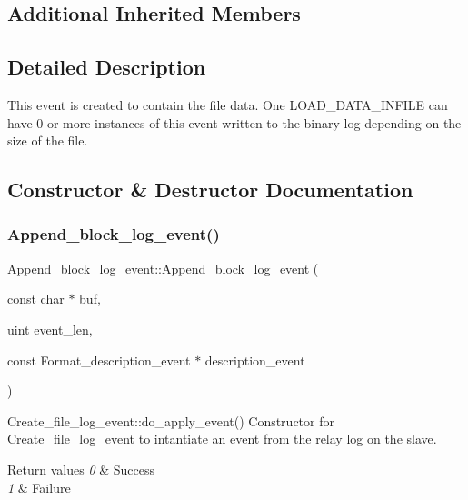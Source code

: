 \subsection*{Additional Inherited Members}


\subsection{Detailed Description}
This event is created to contain the file data. One L\+O\+A\+D\+\_\+\+D\+A\+T\+A\+\_\+\+I\+N\+F\+I\+LE can have 0 or more instances of this event written to the binary log depending on the size of the file. 

\subsection{Constructor \& Destructor Documentation}
\mbox{\label{classAppend__block__log__event_a8154c6cc6d365d7e66dbc9278cec56da}} 
\subsubsection{\texorpdfstring{Append\+\_\+block\+\_\+log\+\_\+event()}{Append\_block\_log\_event()}}
{\footnotesize\ttfamily Append\+\_\+block\+\_\+log\+\_\+event\+::\+Append\+\_\+block\+\_\+log\+\_\+event (\begin{DoxyParamCaption}\item[{const char $\ast$}]{buf,  }\item[{uint}]{event\+\_\+len,  }\item[{const Format\+\_\+description\+\_\+event $\ast$}]{description\+\_\+event }\end{DoxyParamCaption})}

Create\+\_\+file\+\_\+log\+\_\+event\+::do\+\_\+apply\+\_\+event() Constructor for \mbox{\hyperlink{classCreate__file__log__event}{Create\+\_\+file\+\_\+log\+\_\+event}} to intantiate an event from the relay log on the slave.


\begin{DoxyRetVals}{Return values}
{\em 0} & Success \\
\hline
{\em 1} & Failure \\
\hline
\end{DoxyRetVals}


